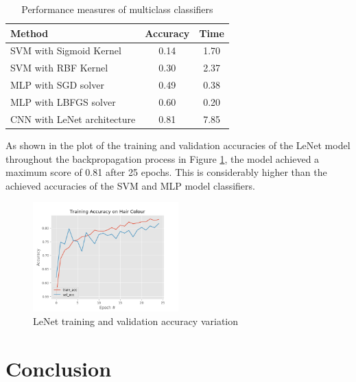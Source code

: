 \documentclass[conference]{IEEEtran}
\begin{document}
\begin{table}[htp]
\caption{Performance measures of multiclass classifiers}
\begin{center}
\renewcommand{\arraystretch}{1.5}
\begin{tabular}{|l|c|c|}
\hline
\hspace{1cm} Method & Accuracy & Time\\ \hline
SVM with Sigmoid Kernel & 0.14 & 1.70\\ \hline
SVM with RBF Kernel & 0.30 & 2.37\\ \hline
MLP with SGD solver & 0.49 & 0.38\\ \hline
MLP with LBFGS solver & 0.60 & 0.20\\ \hline
CNN with LeNet architecture & 0.81 & 7.85\\ \hline
\end{tabular}
\end{center}
\label{tab: mult}
\end{table}%

As shown in the plot of the training and validation accuracies of the LeNet model throughout the backpropagation process in Figure \ref{fig: CNN}, the model achieved a maximum score of 0.81 after 25 epochs. This is considerably higher than the achieved accuracies of the SVM and MLP model classifiers.

\begin{figure} [h] %
  \centering
    \includegraphics[width=0.5\textwidth]{graphs/T5_CNN_Keras} 
    \caption{LeNet training and validation accuracy variation}
    \label{fig: CNN}
\end{figure}

\section{Conclusion} \label{s-concl}

\end{document}
